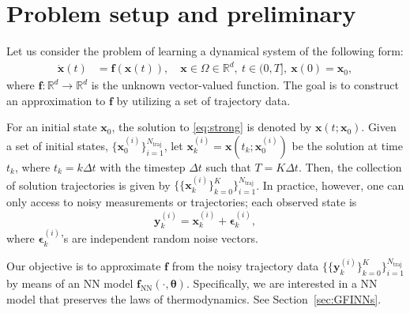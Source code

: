 \documentclass[final]{siamltex}
\newcommand{\bfa}[1]{\boldsymbol{#1}}
\begin{document}
\pagestyle{myheadings}
\thispagestyle{plain}


% 
% 

% 



\section{Problem setup and preliminary}
\label{sec:prelim}
Let us consider the problem of learning a dynamical system of the following form:
\begin{equation}
\label{eq:strong}
\begin{split}
\dot{\bfa{x}}(t) &= \bfa{f}(\bfa{x}(t)), \quad \bfa{x} \in \Omega \in \mathbb{R}^d, \ t \in (0,T], \ 
\bfa{x}(0) = \bfa{x}_0,
\end{split}
\end{equation}
where $\bfa{f}: \mathbb{R}^d \to \mathbb{R}^d$ is the unknown vector-valued function. The goal is to construct an approximation to $\bfa{f}$ by utilizing a set of trajectory data.


For an initial state $\bfa{x}_0$, the solution to \eqref{eq:strong} is denoted by $\bfa{x}(t;\bfa{x}_0)$.
Given a set of initial states, $\{\bfa{x}_0^{(i)}\}_{i=1}^{N_\text{traj}}$, let $\bfa{x}_k^{(i)} = \bfa{x}(t_k;\bfa{x}_0^{(i)})$ be the solution at time $t_k$, where $t_k = k \Delta t$ with the timestep $\Delta t$ such that $T = K\Delta t$.
Then, the collection of solution trajectories is given by 
$\{ \{\bfa{x}_k^{(i)} \}_{k=0}^K \}_{i=1}^{N_\text{traj}}$.
In practice, however, one can only access to noisy measurements or trajectories; each observed state is 
\begin{equation} \label{def:noisy-data}
    \bfa{y}_k^{(i)} = \bfa{x}_k^{(i)} + \bfa{\epsilon}^{(i)}_k,
\end{equation}
where $\bfa{\epsilon}^{(i)}_k$'s are independent random noise vectors. 


Our objective is to approximate $\bfa{f}$ from the noisy trajectory data $\{ \{\bfa{y}_k^{(i)} \}_{k=0}^K \}_{i=1}^{N_\text{traj}}$ by means of an NN model $\bfa{f}_{\text{NN}}(\cdot,\bfa{\theta})$.
Specifically, we are interested in a NN model that preserves the laws of thermodynamics.
See Section~\ref{sec:GFINNs}.
\end{document}
